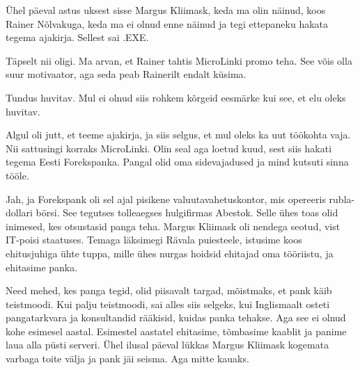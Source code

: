 
Ühel päeval astus uksest sisse Margus 
Kliimask, keda ma olin näinud, koos Rainer Nõlvakuga,
keda ma ei olnud enne näinud ja tegi ettepaneku hakata 
tegema ajakirja. Sellest sai .EXE.


Täpselt nii oligi. Ma arvan, et Rainer tahtis MicroLinki promo teha. 
See võis olla suur motivaator, aga seda peab Rainerilt endalt küsima.


Tundus huvitav. Mul ei olnud siis rohkem kõrgeid eesmärke kui see, et elu oleks 
huvitav.


Algul oli jutt, et teeme ajakirja, ja siis selgus, 
et mul oleks ka uut töökohta vaja. Nii sattusingi korraks MicroLinki. Olin seal aga loetud kuud, sest 
siis hakati tegema Eesti Forekspanka. Pangal olid oma sidevajadused ja mind kutsuti sinna tööle.


Jah, ja Forekspank oli sel ajal pisikene valuutavahetuskontor, mis opereeris 
rubla-dollari börsi.
See tegutses tolleaegses hulgifirmas Abestok. Selle ühes toas olid 
inimesed, kes otsustasid panga teha. Margus 
Kliimask oli nendega seotud, vist IT-poisi 
staatuses. Temaga läksimegi Rävala puiesteele, istusime koos 
ehitusjuhiga ühte tuppa, mille ühes nurgas hoidsid
ehitajad oma tööriistu, ja ehitasime panka.


Need mehed, kes panga tegid, olid piisavalt targad, mõistmaks, et pank käib 
teistmoodi. Kui palju teistmoodi, sai alles siis selgeks, kui 
Inglismaalt osteti pangatarkvara ja konsultandid rääkisid, kuidas panka 
tehakse. Aga see ei olnud kohe esimesel aastal. Esimestel aastatel ehitasime, 
tõmbasime kaablit ja panime laua alla püsti serveri. Ühel ilusal päeval lükkas
Margus Kliimask kogemata varbaga 
toite välja ja pank jäi seisma. Aga mitte kauaks. 

